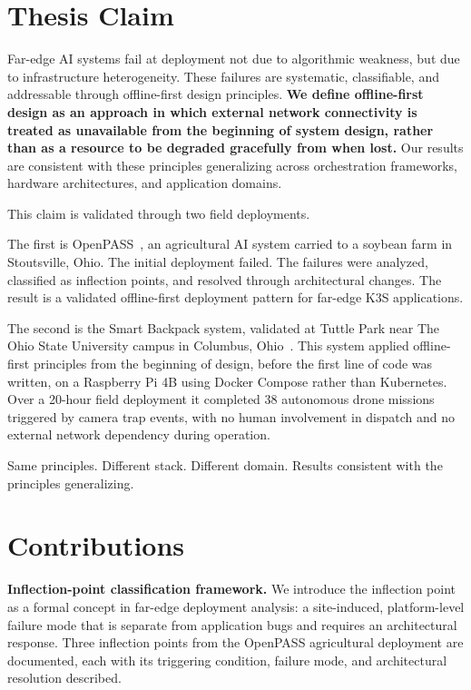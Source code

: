 \section{Thesis Claim}
\label{sec:thesis_claim}
Far-edge AI systems fail at deployment not due to algorithmic weakness, but due to infrastructure heterogeneity. These failures are systematic, classifiable, and addressable through offline-first design principles. \textbf{We define offline-first design as an approach in which external network connectivity is treated as unavailable from the beginning of system design, rather than as a resource to be degraded gracefully from when lost.} Our results are consistent with these principles generalizing across orchestration frameworks, hardware architectures, and application domains.

This claim is validated through two field deployments.

The first is OpenPASS~\cite{irizarry2022scalable,boubin2022marble}, an agricultural AI system carried to a soybean farm in Stoutsville, Ohio. The initial deployment failed. The failures were analyzed, classified as inflection points, and resolved through architectural changes. The result is a validated offline-first deployment pattern for far-edge K3S applications.

The second is the Smart Backpack system, validated at Tuttle Park near The Ohio State University campus in Columbus, Ohio~\cite{kline2025smartwilds}. This system applied offline-first principles from the beginning of design, before the first line of code was written, on a Raspberry Pi 4B using Docker Compose rather than Kubernetes. Over a 20-hour field deployment it completed 38 autonomous drone missions triggered by camera trap events, with no human involvement in dispatch and no external network dependency during operation.

Same principles. Different stack. Different domain. Results consistent with the principles generalizing.
\section{Contributions}
\label{sec:contribution}
\textbf{Inflection-point classification framework.}
We introduce the inflection point as a formal concept in far-edge deployment analysis: a site-induced, platform-level failure mode that is separate from application bugs and requires an architectural response. Three inflection points from the OpenPASS agricultural deployment are documented, each with its triggering condition, failure mode, and architectural resolution described.

